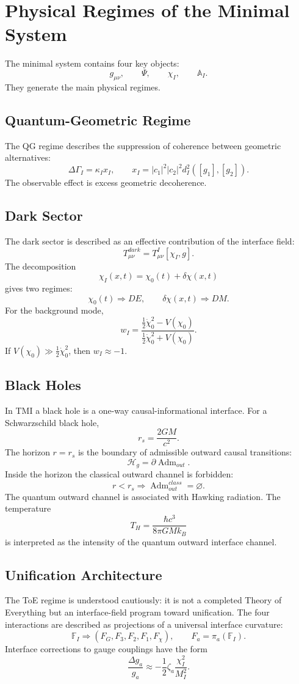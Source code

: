 \documentclass[12pt,a4paper]{article}
\DeclareMathOperator{\Adm}{Adm}
\newcommand{\Acal}{\mathbb A_I}
\newcommand{\Fcal}{\mathbb F_I}
\begin{document}
\section{Physical Regimes of the Minimal System}
The minimal system contains four key objects:
\[
\boxed{g_{\mu\nu},\qquad\Psi,
\qquad\chi_I,
\qquad\Acal.}
\]
They generate the main physical regimes.

\subsection{Quantum-Geometric Regime}
The QG regime describes the suppression of coherence between geometric alternatives:
\[
\boxed{\Delta\Gamma_I=\kappa_Ix_I,
\qquad x_I=|c_1|^2|c_2|^2d_I^2([g_1],[g_2]).}
\]
The observable effect is excess geometric decoherence.

\subsection{Dark Sector}
The dark sector is described as an effective contribution of the interface field:
\[
\boxed{T_{\mu\nu}^{dark}=T_{\mu\nu}^{I}[\chi_I,g].}
\]
The decomposition
\[
\boxed{\chi_I(x,t)=\chi_0(t)+\delta\chi(x,t)}
\]
gives two regimes:
\[
\boxed{\chi_0(t)\Rightarrow DE,
\qquad \delta\chi(x,t)\Rightarrow DM.}
\]
For the background mode,
\[
\boxed{w_I=\frac{\frac12\dot\chi_0^2-V(\chi_0)}{\frac12\dot\chi_0^2+V(\chi_0)}.}
\]
If $V(\chi_0)\gg\frac12\dot\chi_0^2$, then $w_I\approx-1$.

\subsection{Black Holes}
In TMI a black hole is a one-way causal-informational interface. For a Schwarzschild black hole,
\[
\boxed{r_s=\frac{2GM}{c^2}.}
\]
The horizon $r=r_s$ is the boundary of admissible outward causal transitions:
\[
\boxed{\mathcal H_g=\partial\Adm_{out}.}
\]
Inside the horizon the classical outward channel is forbidden:
\[
\boxed{r<r_s\Rightarrow\Adm_{out}^{class}=\varnothing.}
\]
The quantum outward channel is associated with Hawking radiation. The temperature
\[
\boxed{T_H=\frac{\hbar c^3}{8\pi GMk_B}}
\]
is interpreted as the intensity of the quantum outward interface channel.

\subsection{Unification Architecture}
The ToE regime is understood cautiously: it is not a completed Theory of Everything but an interface-field program toward unification. The four interactions are described as projections of a universal interface curvature:
\[
\boxed{\Fcal\Rightarrow(F_G,F_3,F_2,F_1,F_\chi),
\qquad F_a=\pi_a(\Fcal).}
\]
Interface corrections to gauge couplings have the form
\[
\boxed{\frac{\Delta g_a}{g_a}\approx-\frac12\zeta_a\frac{\chi_I^2}{M_I^2}.}
\]
\end{document}
